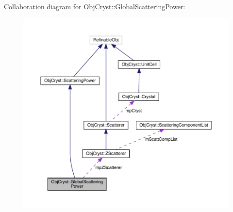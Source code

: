 Collaboration diagram for Obj\+Cryst\+::Global\+Scattering\+Power\+:
\nopagebreak
\begin{figure}[H]
\begin{center}
\leavevmode
\includegraphics[width=350pt]{class_obj_cryst_1_1_global_scattering_power__coll__graph}
\end{center}
\end{figure}
